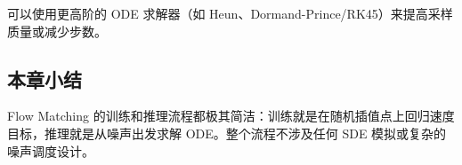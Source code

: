 可以使用更高阶的 ODE 求解器（如 Heun、Dormand-Prince/RK45）来提高采样质量或减少步数。

\subsection{本章小结}

Flow Matching 的训练和推理流程都极其简洁：训练就是在随机插值点上回归速度目标，推理就是从噪声出发求解 ODE。整个流程不涉及任何 SDE 模拟或复杂的噪声调度设计。


